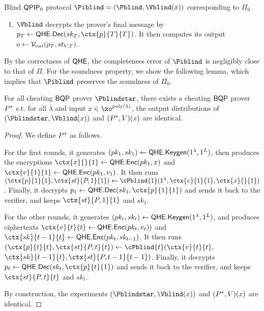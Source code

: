 \begin{protocol}{Blind $\operatorname{\mathsf{QPIP}}_0$ protocol $\Piblind=(\Pblind, \Vblind(x))$ corresponding to $\Pi_0$}
\begin{enumerate}
\begin{enumerate}
                that is, it encrypts its state under the new key by $\ctx{st}{P, t-1}{t-1, t}\leftarrow\QEnc(pk_t, \ctx{st}{P, t-1}{t-1}))$,
                then homomorphically decrypts the old encryption by
                $\ctx{st}{P, t-1}{t}\leftarrow\QEval(pk_t, \QDec,$ \ $\ctx{sk}{t-1}{t}, \ctx{st}{P, t-1}{t-1, t})$.
                Then it applies the next-message function homomorphically, generating
                $(\ctx{p}{t}{t}, \ctx{st}{P, t}{t})\leftarrow\QEval(pk_t, \cP_t, \ctx{v}{t}{t}, \ctx{st}{P, t-1}{t})$.
                It sends $\ctx{p}{t}{t}$ back to the verifier.
        \end{enumerate}
        \item $\Vblind$ decrypts the prover's final message by $p_T\leftarrow\QDec(sk_T, \ctx{p}{T}{T})$.
            It then computes its output $o\leftarrow\mathcal{V}_{out}(p_T, st_{V, T})$.
    \end{enumerate}
\end{protocol}

By the correctness of $\mathsf{QHE}$, the completeness error of $\Piblind$ is negligibly close to that of $\Pi$.
For the soundness property, we show the following lemma, which implies that $\Piblind$ preserves the soundness of $\Pi_0$.


\begin{thm} \label{thm:compiler-errors}
    For all cheating $\operatorname{\mathsf{BQP}}$ prover $\Pblindstar$, there exists a cheating $\operatorname{\mathsf{BQP}}$ prover $P^*$ s.t. for all $\lambda$ and input $x\in\zo^{\poly(\lambda)}$, the output distributions of $(\Pblindstar, \Vblind(x))$ and $(P^*, V)(x)$ are identical.
\end{thm}
\begin{proof}
    We define $P^*$ as follows.
    
    For the first rounds, it generates
    $(pk_1, sk_1)\leftarrow\mathsf{QHE.Keygen}(1^\lambda, 1^L)$, then produces the encryptions
    $\ctx{x}{}{1}\leftarrow\QEnc(pk_1, x)$ and $\ctx{v}{1}{1}\leftarrow\QEnc(pk_1, v_1)$.
    It then runs $(\ctx{p}{1}{1}, \ctx{st}{P, 1}{1})\leftarrow\cPblind{1}(1^\lambda, \ctx{v}{1}{1}, \ctx{x}{}{1})$.
    Finally, it decrypts $p_1\leftarrow\QDec(sk_1, \ctx{p}{1}{1})$ and sends it back to the verifier,
    and keeps $\ctx{st}{P, 1}{1}$ and $sk_1$.

    For the other rounds, it generates
    $(pk_t, sk_t)\leftarrow\mathsf{QHE.Keygen}(1^\lambda, 1^L)$, and produces ciphertexts
    $\ctx{v}{t}{t}\leftarrow\QEnc(pk_t, v_t))$ and $\ctx{sk}{t-1}{t}\leftarrow\QEnc(pk_t, sk_{t-1})$.
    It then runs $(\ctx{p}{t}{t}, \ctx{st}{P, t}{t})\leftarrow\cPblind{t}(\ctx{v}{t}{t},$ \ $\ctx{sk}{t-1}{t}, \ctx{st}{P, t-1}{t-1})$.
    Finally, it decrypts $p_t\leftarrow\QDec(sk_t, \ctx{p}{t}{1})$ and sends it back to the verifier,
    and keeps $\ctx{st}{P, t}{t}$ and $sk_t$.
        
    By construction, the experiments $(\Pblindstar, \Vblind(x))$ and $(P^*, V)(x)$ are identical.
\end{proof}

